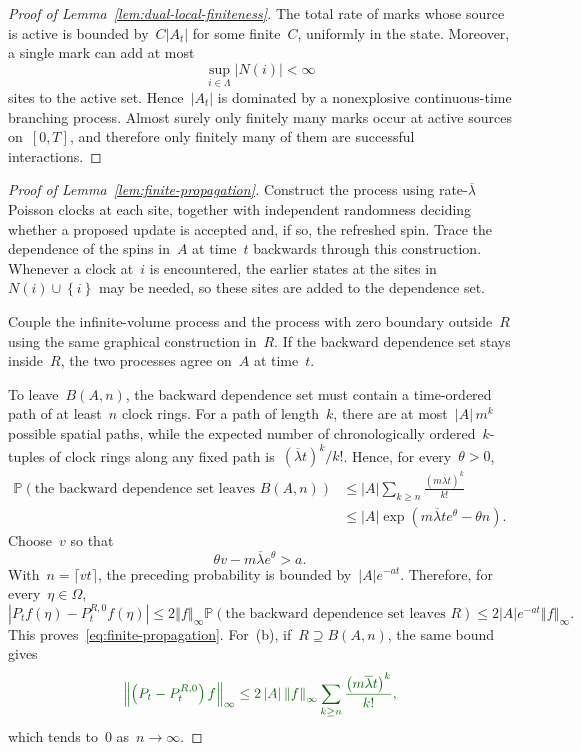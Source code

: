 \documentclass[EJP,preprint,NODS,nobera]{ejpecp}
\newcommand{\pP}{\mathbb{P}}
\newcommand{\bb}[1]{\left(#1\right)}
\newcommand{\cb}[1]{\left\{#1\right\}}
\newcommand{\norm}[1]{\left\Vert#1\right\Vert}
\newcommand{\abs}[1]{\left|#1\right|}
\newcommand{\chg}[1]{{\color{changegreen}#1}}
\begin{document}
\begin{proof}[Proof of Lemma~\ref{lem:dual-local-finiteness}]
The total rate of marks whose source is active is bounded by~$C\abs{A_t}$ for some finite~$C$, uniformly in the state. Moreover, a single
mark can add at most
\begin{equation*}
\sup_{i\in\Lambda}\abs{N(i)}<\infty
\end{equation*}
sites to the active set. Hence~$\abs{A_t}$ is dominated by a nonexplosive
continuous-time branching process. Almost surely only finitely many marks occur
at active sources on~$[0,T]$, and therefore only finitely many of them are
successful interactions.
\end{proof}

\begin{proof}[Proof of Lemma~\ref{lem:finite-propagation}]
Construct the process using rate-$\overline\lambda$ Poisson clocks at each site,
together with independent randomness deciding whether a proposed update is
accepted and, if so, the refreshed spin. Trace the dependence of the spins in~$A$ at time~$t$ backwards through this construction. Whenever a clock at~$i$ is encountered, the earlier states at the sites in~$N(i)\cup\cb{i}$ may be needed, so these sites are added to the dependence
set.

Couple the infinite-volume process and the process with zero boundary outside~$R$ using the same graphical construction in~$R$. If the backward dependence
set stays inside~$R$, the two processes agree on~$A$ at time~$t$.

To leave~$B(A,n)$, the backward dependence set must contain a time-ordered path
of at least~$n$ clock rings. For a path of length~$k$, there are at most~$\abs A\,m^k$ possible spatial paths, while the expected number of
chronologically ordered~$k$-tuples of clock rings along any fixed path is~$(\overline\lambda t)^k/k!$. Hence, for every~$\theta>0$,
\begin{align*}
\pP\bb{\text{the backward dependence set leaves }B(A,n)}
&\leq
\abs A
\sum_{k\geq n}
\frac{\bb{m\overline\lambda t}^k}{k!}
\\
&\leq
\abs A
\exp\bb{
m\overline\lambda t e^\theta-\theta n
}.
\end{align*}
Choose~$v$ so that
\begin{equation*}
\theta v-m\overline\lambda e^\theta>a.
\end{equation*}
With~$n=\lceil vt\rceil$, the preceding probability is bounded by~$\abs A e^{-at}$. Therefore, for
every~$\eta\in\Omega$,
\begin{equation*}
\abs{P_tf(\eta)-P_t^{R,0}f(\eta)}
\leq
2\norm f_\infty
\pP\bb{\text{the backward dependence set leaves }R}
\leq
2\abs A e^{-at}\norm f_\infty.
\end{equation*}
This proves~\eqref{eq:finite-propagation}. \chg{For~(b), if~$R\supseteq B(A,n)$,
the same bound gives}
\begin{equation*}
\chg{\norm{\bb{P_t-P_t^{R,0}}f}_\infty
\leq
2\abs A\norm f_\infty
\sum_{k\geq n}
\frac{\bb{m\overline\lambda t}^k}{k!},}
\end{equation*}
\chg{which tends to~$0$ as~$n\to\infty$.}
\end{proof}
\end{document}
